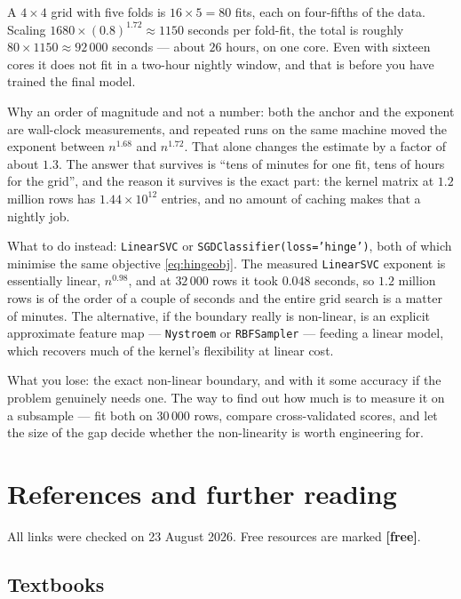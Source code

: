 \documentclass[11pt]{article}
\begin{document}
A $4\times4$ grid with five folds is $16 \times 5 = 80$ fits, each on
four-fifths of the data. Scaling $1680 \times (0.8)^{1.72} \approx 1150$
seconds per fold-fit, the total is roughly $80 \times 1150 \approx 92\,000$
seconds --- about $26$ hours, on one core. Even with sixteen cores it does not
fit in a two-hour nightly window, and that is before you have trained the final
model.

Why an order of magnitude and not a number: both the anchor and the exponent
are wall-clock measurements, and repeated runs on the same machine moved the
exponent between $n^{1.68}$ and $n^{1.72}$. That alone changes the estimate by
a factor of about $1.3$. The answer that survives is ``tens of minutes for one
fit, tens of hours for the grid'', and the reason it survives is the exact
part: the kernel matrix at $1.2$ million rows has $1.44 \times 10^{12}$
entries, and no amount of caching makes that a nightly job.

What to do instead: \texttt{LinearSVC} or
\texttt{SGDClassifier(loss='hinge')}, both of which minimise the same
objective \eqref{eq:hingeobj}. The measured \texttt{LinearSVC} exponent is
essentially linear, $n^{0.98}$, and at $32\,000$ rows it took $0.048$ seconds,
so $1.2$ million rows is of the order of a couple of seconds and the entire
grid search is a matter of minutes. The alternative, if the boundary really is non-linear, is an explicit
approximate feature map --- \texttt{Nystroem} or \texttt{RBFSampler} --- feeding
a linear model, which recovers much of the kernel's flexibility at linear cost.

What you lose: the exact non-linear boundary, and with it some accuracy if the
problem genuinely needs one. The way to find out how much is to measure it on a
subsample --- fit both on $30\,000$ rows, compare cross-validated scores, and
let the size of the gap decide whether the non-linearity is worth engineering
for.

\section{References and further reading}
\label{sec:refs}

All links were checked on 23 August 2026. Free resources are marked
\textbf{[free]}.

\subsection*{Textbooks}
\end{document}
